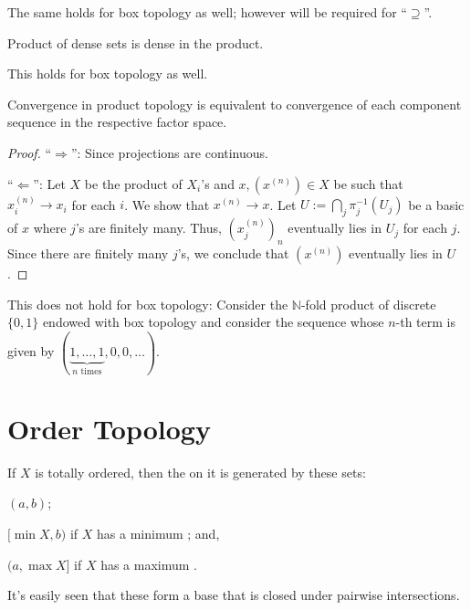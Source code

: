 	\begin{rmk}
		The same holds for box topology as well; however \AC will be required for ``$\supseteq$''.
	\end{rmk}
	
	\begin{cor}
		Product of dense sets is dense in the product.
	\end{cor}
	
	\begin{rmk}
		This holds for box topology as well.
	\end{rmk}
	
	
	\begin{prp}[Convergence]\label{PRP: convergence in prod topo}
		Convergence in product topology is equivalent to convergence of each component sequence in the respective factor space.
	\end{prp}
	
	\begin{proof}
		``$\Rightarrow$'': Since projections are continuous.
		
		``$\Leftarrow$'': Let $X$ be the product of $X_i$'s and $x, (x^{(n)})\in X$ be such that $x^{(n)}_i\to x_i$ for each $i$. We show that $x^{(n)}\to x$. Let $U := \bigcap_j \pi_j^{-1}(U_j)$ be a basic \onbd of $x$ where $j$'s are finitely many. Thus, $(x^{(n)}_j)_n$ eventually lies in $U_j$ for each $j$. Since there are finitely many $j$'s, we conclude that $(x^{(n)})$ eventually lies in $U$.
	\end{proof}
	
	\begin{rmk}
		This does not hold for box topology: Consider the $\mathbb N$-fold product of discrete $\{0, 1\}$ endowed with box topology and consider the sequence whose $n$-th term is given by $(\underbrace{1, \ldots, 1}_\text{$n$ times}, 0, 0, \ldots)$.
	\end{rmk}
	
	


\section{Order Topology}\label{SEC: order topo}

	If $X$ is totally ordered, then the  on it is generated by these sets:
	\begin{rmklist}
		\item $(a, b)$;
		\item $[\min X, b)$ if $X$ has a minimum \elt; and,
		\item $(a, \max X]$ if $X$ has a maximum \elt.
	\end{rmklist}
	It's easily seen that these form a base that is closed under pairwise intersections.

